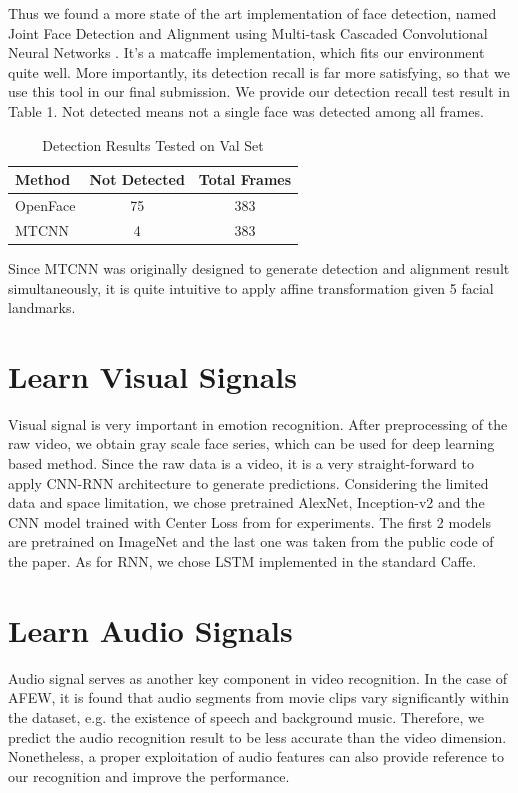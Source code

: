 \documentclass[10pt,twocolumn,letterpaper]{article}
\begin{document}
Thus we found a more state of the art implementation of face detection, named Joint Face Detection and Alignment using Multi-task Cascaded Convolutional Neural Networks \cite{7553523}. It's a matcaffe implementation, which fits our environment quite well. More importantly, its detection recall is far more satisfying, so that we use this tool in our final submission. We provide our detection recall test result in Table 1. Not detected means not a single face was detected among all frames. 

\begin{table}[htpb]
	\begin{center}
		\begin{tabular}{|l|c|c|}
			\hline
			Method & Not Detected & Total Frames\\
			\hline\hline
			OpenFace & 75 & 383\\
			\hline
			MTCNN & 4 & 383\\
			\hline
		\end{tabular}
	\end{center}
	\caption{Detection Results Tested on Val Set}
\end{table}

Since MTCNN was originally designed to generate detection and alignment result simultaneously, it is quite intuitive to apply affine transformation given 5 facial landmarks.


\section{Learn Visual Signals}

Visual signal is very important in emotion recognition. After preprocessing of the raw video, we obtain gray scale face series, which can be used for deep learning based method. Since the raw data is a video, it is a very straight-forward to apply CNN-RNN architecture to generate predictions. Considering the limited data and space limitation, we chose pretrained AlexNet, Inception-v2 and the CNN model trained with Center Loss from \cite{wen2016discriminative} for experiments. The first 2 models are pretrained on ImageNet and the last one was taken from the public code of the paper. As for RNN, we chose LSTM implemented in the standard Caffe.

\section{Learn Audio Signals}

Audio signal serves as another key component in video recognition. In the case of AFEW, it is found that audio segments from movie clips vary significantly within the dataset, e.g. the existence of speech and background music. Therefore, we predict the audio recognition result to be less accurate than the video dimension. Nonetheless, a proper exploitation of audio features can also provide reference to our recognition and improve the performance.
\end{document}
